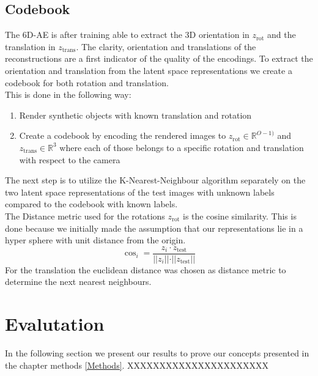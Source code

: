 \documentclass[10pt,a4paper]{article}
\newcommand{\rot}{\ensuremath{\text{rot}\xspace}}
\newcommand{\trans}{\ensuremath{\text{trans}\xspace}}
\begin{document}
\subsection{Codebook}\label{Codebook}
The 6D-AE is after training able to extract the 3D orientation in $z_{\rot}$ and the translation in $z_{\trans}$. The clarity, orientation and translations of the reconstructions are a first indicator of the quality of the encodings. To extract the orientation and translation from the latent space representations we create a codebook for both rotation and translation.\\
This is done in the following way:
\begin{enumerate}
\item Render synthetic objects with known translation and rotation\\
\item Create a codebook by encoding the rendered images to $z_{\rot}\in \mathbb{R}^{O-1)}$ and $z_{\trans} \in \mathbb{R}^3$ where each of those belongs to a specific rotation and translation with respect to the camera
\end{enumerate}
The next step is to utilize the K-Nearest-Neighbour algorithm separately on the two latent space representations of the test images with unknown labels compared to the codebook with known labels.\\
The Distance metric used for the rotations $z_{\rot}$ is the cosine similarity. This is done because we initially made the assumption that our representations lie in a hyper sphere with unit distance from the origin.
\begin{equation}
\cos_i = \dfrac{z_i \cdot z_{\text{test}}}{ \vert\vert  z_i \vert \vert \cdot \vert \vert z_{\text{test}} \vert \vert }
\end{equation}
For the translation the euclidean distance was chosen as distance metric to determine the next nearest neighbours.



\newpage
\section{Evalutation}\label{Evaluation}
In the following section we present our results to prove our concepts presented in the chapter methods \ref{Methods}.
XXXXXXXXXXXXXXXXXXXXXX
\end{document}
